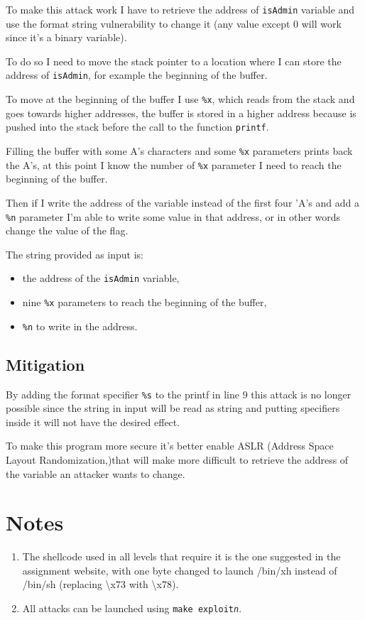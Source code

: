 \documentclass[a4paper,12pt]{article}
\begin{document}
To make this attack work I have to retrieve the address of \texttt{isAdmin} variable and use the format string vulnerability to change it (any value except 0 will work since it's a binary variable). 

To do so I need to move the stack pointer to a location where I can store the address of \texttt{isAdmin}, for example the beginning of the buffer.

To move at the beginning of the buffer I use \texttt{\%x}, which reads from the stack and goes towards higher addresses, the buffer is stored in a higher address because is pushed into the stack before the call to the function \texttt{printf}.

Filling the buffer with some A's characters and some \texttt{\%x} parameters %
prints back the A's, at this point I know the number of \texttt{\%x} parameter I need to reach the beginning of the buffer.

Then if I write the address of the variable instead of the first four 'A's and add a \texttt{\%n} parameter I'm able to write some value in that address, or in other words change the value of the flag.

The string provided as input is:
\begin{itemize}
\item the address of the \texttt{isAdmin} variable,
\item nine \texttt{\%x} parameters to reach the beginning of the buffer,
\item \texttt{\%n} to write in the address.
\end{itemize}


\subsection{Mitigation}

By adding the format specifier \texttt{\%s} to the printf in line 9 this attack is no longer possible since the string in input will be read as string and putting specifiers inside it will not have the desired effect.

To make this program more secure it's better enable ASLR (Address Space Layout Randomization,)that will make more difficult to retrieve the address of the variable an attacker wants to change. 


\section{Notes}
\begin{enumerate}


\item The shellcode used in all levels that require it is the one suggested in the assignment website, with one byte changed to launch /bin/xh instead of /bin/sh (replacing \textbackslash x73 with \textbackslash x78).


\item All attacks can be launched using \texttt{make exploit\textit{n}}.
\end{enumerate}
\end{document}
